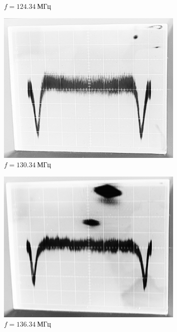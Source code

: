 \documentclass[14pt, a4paper]{report}
\begin{document}
\begin{enumerate}
\begin{figure}[H]
\begin{subfigure}{.5\textwidth}
  \caption{$f=124.34\ МГц$}
\end{subfigure}
\begin{subfigure}{.5\textwidth}
  \centering
  \includegraphics[width=.95\linewidth]{../images/5101-7a}
  \caption{$f=130.34\ МГц$}
\end{subfigure}%
\begin{subfigure}{.5\textwidth}
  \centering
  \includegraphics[width=.95\linewidth]{../images/5101-7b}
  \caption{$f=136.34\ МГц$}
\end{subfigure}
\begin{subfigure}{.5\textwidth}
  \centering

\end{subfigure}
\end{figure}
\end{enumerate}
\end{document}

